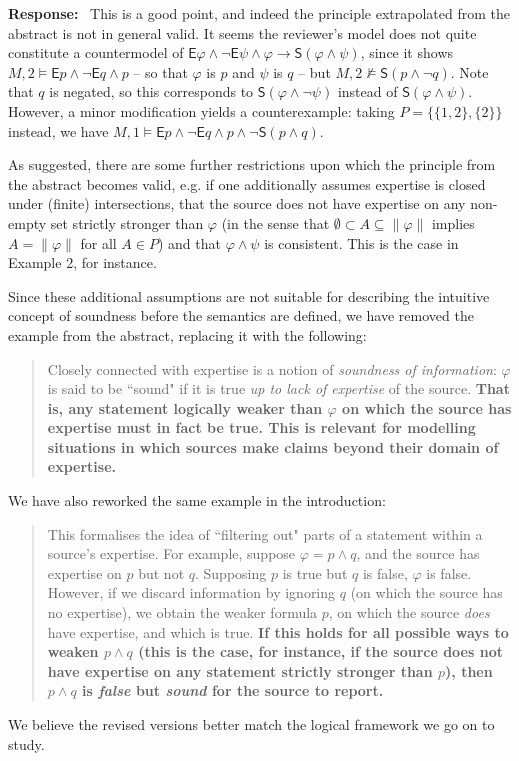 \documentclass[12pt]{article}
\newenvironment{response}{
    \noindent\textbf{Response:}\
}{\vspace{5mm}}
\renewcommand{\phi}{\varphi}
\newcommand{\E}{\mathsf{E}}
\renewcommand{\S}{\mathsf{S}}
\begin{document}
\begin{response}
    This is a good point, and indeed the principle extrapolated from the
    abstract is not in general valid. It seems the reviewer's model does not
    quite constitute a countermodel of $\E\phi \land \neg\E\psi \land \phi
    \rightarrow \S(\phi \land \psi)$, since it shows $M, 2 \models \E{p} \land
    \neg\E{q} \land p$ -- so that $\phi$ is $p$ and $\psi$ is $q$ -- but $M, 2
    \not\models \S(p \land \neg{q})$. Note that $q$ is negated, so this
    corresponds to $\S(\phi \land \neg\psi)$ instead of $\S(\phi \land \psi)$.
    However, a minor modification yields a counterexample: taking $P = \{\{1,
    2\}, \{2\}\}$ instead, we have $M, 1 \models \E{p} \land \neg\E{q} \land p
    \land \neg\S(p \land q)$.

    As suggested, there are some further restrictions upon which the principle
    from the abstract becomes valid, e.g. if one additionally assumes expertise
    is closed under (finite) intersections, that the source does not have
    expertise on any non-empty set strictly stronger than $\phi$ (in the sense
    that $\emptyset \subset A \subseteq \|\phi\|$ implies $A = \|\phi\|$ for
    all $A \in P$) and that $\phi \land \psi$ is consistent. This is the case
    in Example 2, for instance.

    Since these additional assumptions are not suitable for describing the
    intuitive concept of soundness before the semantics are defined, we have
    removed the example from the abstract, replacing it with the following:

    \begin{quotation}
        Closely connected with expertise is a notion of \emph{soundness of
        information}: $\phi$ is said to be ``sound" if it is true \emph{up to
        lack of expertise} of the source. \textbf{That is, any statement
        logically weaker than $\phi$ on which the source has expertise must in
        fact be true. This is relevant for modelling situations in which
        sources make claims beyond their domain of expertise.}
    \end{quotation}

    We have also reworked the same example in the introduction:

    \begin{quotation}
        This formalises the idea of ``filtering out" parts of a statement
        within a source's expertise. For example, suppose $\phi = p \land q$,
        and the source has expertise on $p$ but not $q$. Supposing $p$ is true
        but $q$ is false, $\phi$ is false. However, if we discard information
        by ignoring $q$ (on which the source has no expertise), we obtain the
        weaker formula $p$, on which the source \emph{does} have expertise, and
        which is true. \textbf{If this holds for all possible ways to weaken $p
        \land q$ (this is the case, for instance, if the source does not have
        expertise on any statement strictly stronger than $p$), then $p \land
        q$ is \emph{false} but \emph{sound} for the source to report.}
    \end{quotation}

    We believe the revised versions better match the logical framework we go on
    to study.
\end{response}
\end{document}
